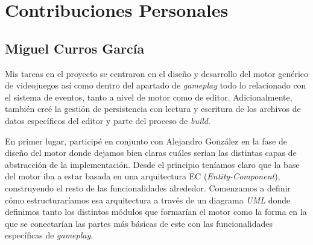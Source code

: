 \chapter{Contribuciones Personales}
\label{cap:contribucionesPersonales}

\section*{Miguel Curros García}
Mis tareas en el proyecto se centraron en el diseño y desarrollo del motor genérico de videojuegos así como dentro del apartado de \textit{gameplay} todo lo relacionado con el sistema de eventos, tanto a nivel de motor como de editor. Adicionalmente, también creé la gestión de persistencia con lectura y escritura de los archivos de datos específicos del editor y parte del proceso de \textit{build}.

\medskip

En primer lugar, participé en conjunto con Alejandro González en la fase de diseño del motor donde dejamos bien claras cuáles serían las distintas capas de abstracción de la implementación. Desde el principio teníamos claro que la base del motor iba a estar basada en una arquitectura EC (\textit{Entity-Component}), construyendo el resto de las funcionalidades alrededor. Comenzamos a definir cómo estructuraríamos esa arquitectura a través de un diagrama \textit{UML} donde definimos tanto los distintos módulos que formarían el motor como la forma en la que se conectarían las partes más básicas de este con las funcionalidades específicas de \textit{gameplay}.

\medskip
 
